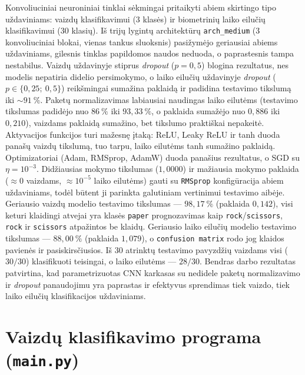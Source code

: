 \documentclass[]{VUMIFTemplateClass}
\begin{document}

Konvoliuciniai neuroniniai tinklai sėkmingai pritaikyti abiem skirtingo tipo uždaviniams: vaizdų klasifikavimui (3 klasės) ir biometrinių laiko eilučių klasifikavimui (30 klasių). Iš trijų lygintų architektūrų \texttt{arch\_medium} (3 konvoliuciniai blokai, vienas tankus sluoksnis) pasižymėjo geriausiai abiems uždaviniams, gilesnis tinklas papildomos naudos neduoda, o paprastesnis tampa nestabilus. Vaizdų uždavinyje stiprus \textit{dropout} (\(p = 0{,}5\)) blogina rezultatus, nes modelis nepatiria didelio persimokymo, o laiko eilučių uždavinyje \textit{dropout} (\(p \in \{0{,}25;\ 0{,}5\}\)) reikšmingai sumažina paklaidą ir padidina testavimo tikslumą iki \(\sim 91~\%\). Paketų normalizavimas labiausiai naudingas laiko eilutėms (testavimo tikslumas padidėjo nuo \(86~\%\) iki \(93{,}33~\%\), o paklaida sumažėjo nuo \(0{,}886\) iki \(0{,}210\)), vaizdams paklaidą sumažino, bet tikslumo praktiškai nepakeitė. Aktyvacijos funkcijos turi mažesnę įtaką: ReLU, Leaky ReLU ir tanh duoda panašų vaizdų tikslumą, tuo tarpu, laiko eilutėms tanh sumažino paklaidą. Optimizatoriai (Adam, RMSprop, AdamW) duoda panašius rezultatus, o SGD su \(\eta = 10^{-3}\). Didžiausias mokymo tikslumas (\(1{,}0000\)) ir mažiausia mokymo paklaida (\(\approx 0\) vaizdams, \(\approx 10^{-5}\) laiko eilutėms) gauti su \texttt{RMSprop} konfigūracija abiem uždaviniams, todėl būtent ji parinkta galutiniam vertinimui testavimo aibėje. Geriausio vaizdų modelio testavimo tikslumas --- \(98{,}17~\%\) (paklaida \(0{,}142\)), visi keturi klaidingi atvejai yra klasės \texttt{paper} prognozavimas kaip \texttt{rock}/\texttt{scissors}, \texttt{rock} ir \texttt{scissors} atpažintos be klaidų. Geriausio laiko eilučių modelio testavimo tikslumas --- \(88{,}00~\%\) (paklaida \(1{,}079\)), o \texttt{confusion matrix} rodo jog klaidos pavienės ir pasiskirsčiusios. Iš 30 atrinktų testavimo pavyzdžių vaizdams visi (\(30/30\)) klasifikuoti teisingai, o laiko eilutėms --- \(28/30\). Bendras darbo rezultatas patvirtina, kad parametrizuotas CNN karkasas su nedidele paketų normalizavimo ir \textit{dropout} panaudojimu yra paprastas ir efektyvus sprendimas tiek vaizdo, tiek laiko eilučių klasifikacijos uždaviniams.


\printbibliography[title = {Literatūra ir šaltiniai}]


\appendix
\renewcommand{\thesection}{\arabic{section} priedas.}

\section{\phantom{Priedas} Vaizdų klasifikavimo programa (\texttt{main.py})}\label{app:main}
\end{document}
